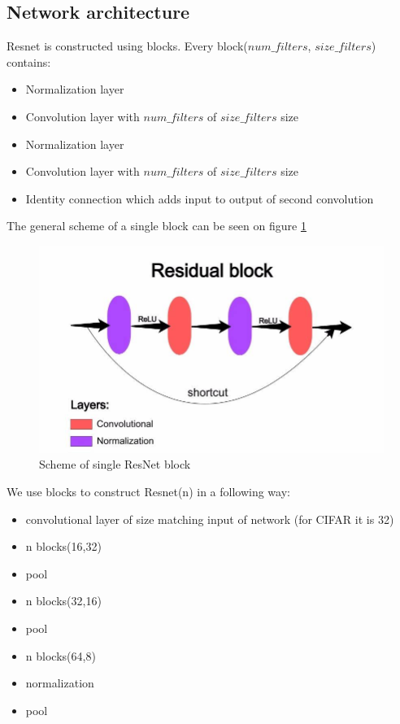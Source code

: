 \documentclass[licencjacka]{pracamgr}
\begin{document}
		\subsection{Network architecture}
		Resnet is constructed using blocks. Every block($num\_filters$, $size\_filters$) contains:
		\begin{itemize}
			\item Normalization layer
			\item Convolution layer with $num\_filters$ of $size\_filters$ size
			\item Normalization layer
			\item Convolution layer with $num\_filters$ of $size\_filters$ size
			\item Identity connection which adds input to output of second convolution
		\end{itemize}
		The general scheme of a single block can be seen on figure \ref{fig:144}
		\begin{figure}[h]
		\caption{Scheme of single ResNet block}
		\label{fig:144}
				\centering
				\includegraphics[width=\textwidth]{images/block}
		\end{figure}
		We use blocks to construct Resnet(n) in a following way:
		\begin{itemize}
			\item convolutional layer of size matching input of network (for CIFAR it is 32)
			\item n blocks(16,32)
			\item pool
			\item n blocks(32,16)
			\item pool
			\item n blocks(64,8)
			\item normalization 
			\item pool
		\end{itemize}
\end{document}
